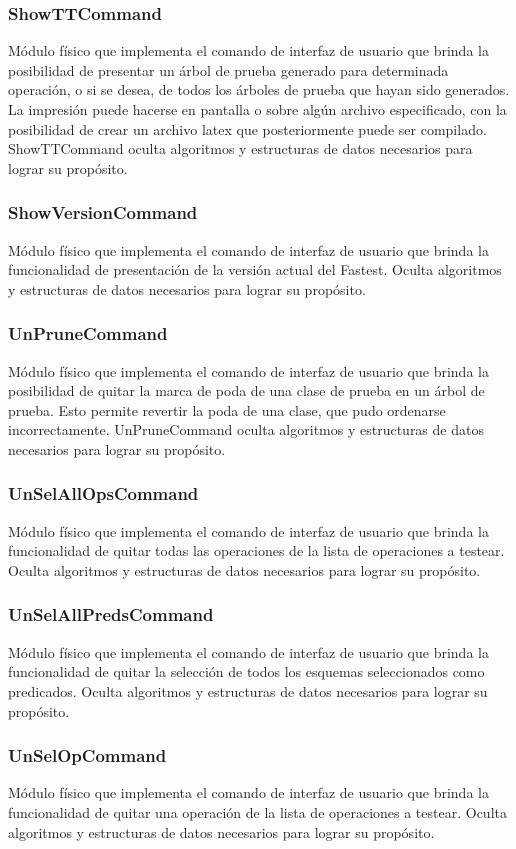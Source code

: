 \documentclass[a4paper,10pt]{report}
\begin{document}
			\subsubsection{ShowTTCommand}
			Módulo físico que implementa el comando de interfaz de usuario que brinda la posibilidad de presentar un árbol de prueba generado para determinada operación, o si se desea, de todos los árboles de prueba que hayan sido generados. La impresión puede hacerse en pantalla o sobre algún archivo especificado, con la posibilidad de crear un archivo latex que posteriormente puede ser compilado. ShowTTCommand oculta algoritmos y estructuras de datos necesarios para lograr su propósito.
			\subsubsection{ShowVersionCommand}
			Módulo físico que implementa el comando de interfaz de usuario que brinda la funcionalidad de presentación de la versión actual del Fastest. Oculta algoritmos y estructuras de datos necesarios para lograr su propósito.
			\subsubsection{UnPruneCommand}
			Módulo físico que implementa el comando de interfaz de usuario que brinda la posibilidad de quitar la marca de poda de una clase de prueba en un árbol de prueba. Esto permite revertir la poda de una clase, que pudo ordenarse incorrectamente. UnPruneCommand oculta algoritmos y estructuras de datos necesarios para lograr su propósito.
			\subsubsection{UnSelAllOpsCommand}
			Módulo físico que implementa el comando de interfaz de usuario que brinda la funcionalidad de quitar todas las operaciones de la lista de operaciones a testear. Oculta algoritmos y estructuras de datos necesarios para lograr su propósito.
			\subsubsection{UnSelAllPredsCommand}
			Módulo físico que implementa el comando de interfaz de usuario que brinda la funcionalidad de quitar la selección de todos los esquemas seleccionados como predicados. Oculta algoritmos y estructuras de datos necesarios para lograr su propósito.
			\subsubsection{UnSelOpCommand}
			Módulo físico que implementa el comando de interfaz de usuario que brinda la funcionalidad de quitar una operación de la lista de operaciones a testear. Oculta algoritmos y estructuras de datos necesarios para lograr su propósito.
\end{document}
